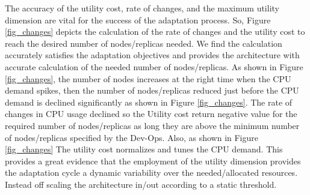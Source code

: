 \documentclass[graybox]{svmult}
\begin{document}

The accuracy of the utility cost, rate of changes, and the maximum utility dimension are vital for the success of the adaptation process. So, Figure \ref{fig_changes} depicts the calculation of the rate of changes and the utility cost to reach the desired number of nodes/replicas needed. We find the calculation accurately satisfies the adaptation objectives and provides the architecture with accurate calculation of the needed number of nodes/replicas. As shown in Figure \ref{fig_changes}, the number of nodes increases at the right time when the CPU demand spikes, then the number of nodes/replicas reduced just before the CPU demand is declined significantly as shown in Figure \ref{fig_changes}. The rate of changes in CPU usage declined so the Utility cost return negative value for the required number of nodes/replicas as long they are above the minimum number of nodes/replicas specified by the Dev-Ops. Also, as shown in Figure \ref{fig_changes} The utility cost normalizes and tunes the CPU demand. This provides a great evidence that the employment of the utility dimension provides the adaptation cycle a dynamic variability over the needed/allocated resources. Instead off scaling the architecture in/out according to a static threshold. 
\end{document}
